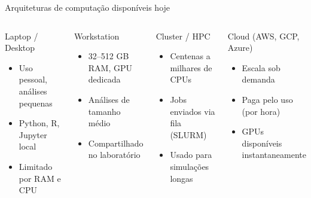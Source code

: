 \begin{frame}{Arquiteturas de computação disponíveis hoje}
\begin{columns}
\begin{block}{Laptop / Desktop}
\begin{itemize}
    \item Uso pessoal, análises pequenas
    \item Python, R, Jupyter local
    \item Limitado por RAM e CPU
\end{itemize}
\end{block}
\vspace{0.2cm}
\begin{block}{Workstation}
\begin{itemize}
    \item 32--512 GB RAM, GPU dedicada
    \item Análises de tamanho médio
    \item Compartilhado no laboratório
\end{itemize}
\end{block}

\begin{block}{Cluster / HPC}
\begin{itemize}
    \item Centenas a milhares de CPUs
    \item Jobs enviados via fila (SLURM)
    \item Usado para simulações longas
\end{itemize}
\end{block}
\vspace{0.2cm}
\begin{block}{Cloud (AWS, GCP, Azure)}
\begin{itemize}
    \item Escala sob demanda
    \item Paga pelo uso (por hora)
    \item GPUs disponíveis instantaneamente
\end{itemize}
\end{block}
\end{columns}
\end{frame}

